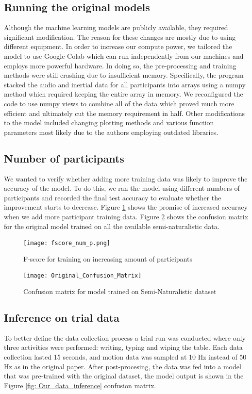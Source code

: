 \documentclass[conference]{IEEEtran}
\begin{document}
	\subsection{Running the original models}
	Although the machine learning models are publicly available, they required significant modification. The reason for these changes are mostly due to using different equipment. In order to increase our compute power, we tailored the model to use Google Colab which can run independently from our machines and employs more powerful hardware. In doing so, the pre-processing and training methods were still crashing due to insufficient memory. Specifically, the program stacked the audio and inertial data for all participants into arrays using a numpy method which required keeping the entire array in memory. We reconfigured the code to use numpy views to combine all of the data which proved much more efficient and ultimately cut the memory requirement in half.
	Other modifications to the model included changing plotting methods and various function parameters most likely due to the authors employing outdated libraries.
	
	\subsection{Number of participants}
	We wanted to verify whether adding more training data was likely to improve the accuracy of the model. To do this, we ran the model using different numbers of participants and recorded the final test accuracy to evaluate whether the improvement starts to decrease. Figure \ref{fig: f-score_vs_participants} shows the promise of increased accuracy when we add more participant training data.
	Figure \ref{fig: Original_Confusion_Matrix} shows the confusion matrix for the original model trained on all the available semi-naturalistic data.
	
	\begin{figure}[h]
		\centering
		\texttt{[image: fscore\_num\_p.png]}
		\caption{F-score for training on increasing amount of participants}
		\label{fig: f-score_vs_participants}
	\end{figure}
	
	\begin{figure}[h]
		\centering
		\texttt{[image: Original\_Confusion\_Matrix]}
		\caption{Confusion matrix for model trained on Semi-Naturalistic dataset}
		\label{fig: Original_Confusion_Matrix}
	\end{figure}
	
	\subsection{Inference on trial data}
	To better define the data collection process a trial run was conducted where only three activities were performed: writing, typing and wiping the table.
	Each data collection lasted 15 seconds, and motion data was sampled at 10 Hz instead of 50 Hz as in the original paper.
	After post-procesing, the data was fed into a model that was pre-trained with the original dataset, the model output is shown in the Figure \ref{fig: Our_data_inference} confusion matrix.
	
\end{document}
